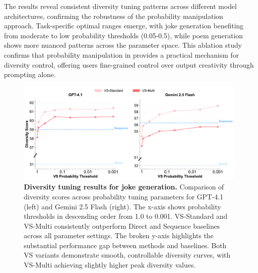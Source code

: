 The results reveal consistent diversity tuning patterns across different model architectures, confirming the robustness of the probability manipulation approach. Task-specific optimal ranges emerge, with joke generation benefiting from moderate to low probability thresholds (0.05-0.5), while poem generation shows more nuanced patterns across the parameter space. This ablation study confirms that probability manipulation in \ours provides a practical mechanism for diversity control, offering users fine-grained control over output creativity through prompting alone.

\begin{figure}[h]
    \centering
    \includegraphics[width=\linewidth]{figures/appendix/diversity_tuning/joke_diversity_tuning_comparison.pdf}
    \caption{
    \textbf{Diversity tuning results for joke generation.}
    Comparison of diversity scores across probability
  tuning parameters for GPT-4.1 (left) and Gemini 2.5 Flash
  (right). The x-axis shows probability thresholds in descending
  order from 1.0 to 0.001. VS-Standard and VS-Multi consistently
  outperform Direct and Sequence baselines across all parameter
  settings. The broken y-axis highlights the substantial
  performance gap between \ours methods and baselines. Both VS
  variants demonstrate smooth, controllable diversity curves,
  with VS-Multi achieving slightly higher peak diversity values.
    }
    \label{fig:diversity_tuning_joke}
\end{figure}

